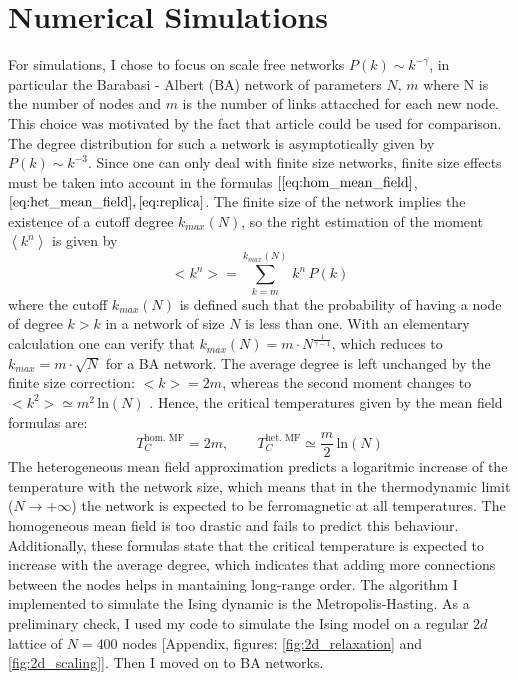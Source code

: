\section{Numerical Simulations}
For simulations, I chose to focus on scale free networks $P(k) \sim k^{-\gamma}$, in particular the Barabasi - Albert (BA) network of parameters $N,\, m$ where N is the number of nodes and $m$ is the number of links attacched for each new node. This choice was motivated by the fact that article \cite{numeric_ising} could be used for comparison. The degree distribution for such a network is asymptotically given by $P(k) \sim k^{-3}$. Since one can only deal with finite size networks, finite size effects must be taken into account in the formulas $[\ref{eq:hom_mean_field}$, $\ref{eq:het_mean_field}, \ref{eq:replica}$.
The finite size of the network implies the existence of a cutoff degree $k_{max}(N)$, so the right estimation of the moment $\left\langle k^n \right \rangle$ is given by
\begin{equation*}
    <k^n> = \sum_{k=m}^{k_{max}(N)}\, k^n\,P(k)
\end{equation*}
where the cutoff $k_{max}(N)$ is defined such that the probability of having a node of degree $k>k$ in a network of size $N$ is less than one. With an elementary calculation one can verify that $k_{max}(N)= m\cdot N^{\frac{1}{\gamma -1}}$, which reduces to $k_{max} = m\cdot \sqrt{N}$ for a BA network.
The average degree is left unchanged by the finite size correction:  $<k> = 2m$, whereas the second moment changes to $<k^2> \simeq m^2\,\text{ln}(N)$ \cite{analytical_ising}. Hence, the critical temperatures given by the mean field formulas are:
\begin{equation}
    T_C^{\text{hom. MF}} = 2m, \quad \quad T_C^{\text{het. MF}} \simeq \frac{m}{2}\,\text{ln}(N)
\end{equation}
The heterogeneous mean field approximation predicts a logaritmic increase of the temperature with the network size, which means that in the thermodynamic limit ($N\rightarrow +\infty$) the network is expected to be ferromagnetic at all temperatures. The homogeneous mean field is too drastic and fails to predict this behaviour. Additionally, these formulas state that the critical temperature is expected to increase with the average degree, which indicates that adding more connections between the nodes helps in mantaining long-range order.
\bigskip \newline \noindent
The algorithm I implemented to simulate the Ising dynamic is the Metropolis-Hasting. As a preliminary check, I used my code to simulate the Ising model on a regular $2d$ lattice of $N =400$ nodes [Appendix, figures: \ref{fig:2d_relaxation} and \ref{fig:2d_scaling}]. Then I moved on to BA networks.

